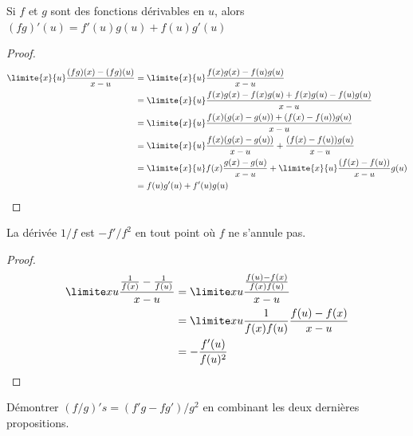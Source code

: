 \begin{frame}
  \begin{proposition}
    Si \(f\) et \(g\) sont des fonctions dérivables en \(u\), alors \((fg)'(u) = f'(u)g(u) + f(u) g'(u)\)
  \end{proposition}
  \begin{proof}\pause%
    \begin{align*}
      \limite{x}{u} \frac{(fg)(x)-(fg)(u)}{x-u} &= \limite{x}{u} \frac{f(x)g(x) - f(u)g(u)}{x-u}\\
                                                &= \limite{x}{u} \frac{f(x)g(x) - f(x) g(u) + f(x) g(u) - f(u)g(u)}{x-u}\\
                                                &= \limite{x}{u} \frac{f(x)(g(x) - g(u)) + (f(x) - f(u))g(u)}{x-u}\\
                                                &= \limite{x}{u} \frac{f(x)(g(x) - g(u))}{x-u} + \frac{(f(x) - f(u))g(u)}{x-u}\\
                                                &= \limite{x}{u} f(x) \frac{g(x) - g(u)}{x-u} + \limite{x}{u} \frac{(f(x) - f(u))}{x-u} g(u)\\
                                                &= f(u) g'(u) + f'(u) g(u)
    \end{align*}
  \end{proof}
\end{frame}
\begin{frame}
  \begin{proposition}
    La dérivée \(1/f\) est \(-f'/f^{2}\) en tout point où \(f\) ne s'annule pas.
  \end{proposition}
  \begin{proof}\pause%
    \begin{align*}
      \limite x u \frac{\frac{1}{f(x)} - \frac{1}{f(u)}}{x-u} &= \limite x u \frac{\frac{f(u) - f(x)}{f(x)f(u)}}{x-u}\\
&= \limite x u \frac{1}{f(x)f(u)} \frac{f(u)-f(x)}{x-u}\\
      &= -\frac{f'(u)}{f(u)^{2}}
    \end{align*}
  \end{proof}
  \begin{exercise}%
    Démontrer \((f/g)'s = (f'g-fg')/g^{2}\) en combinant les deux dernières propositions.
  \end{exercise}
\end{frame}
